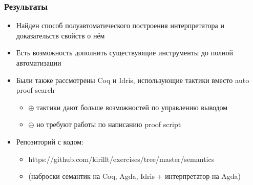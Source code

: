 \documentclass[10pt,pdf,hyperref={unicode}]{beamer}
\begin{document}
      \begin{frame}
          \frametitle{Результаты}
          \begin{itemize}
             \item Найден способ полуавтоматического построения интерпретатора и доказательств свойств о нём
             \item Есть возможность дополнить существующие инструменты до полной автоматизации
             \item Были также рассмотрены Coq и Idris, использующие тактики вместо auto proof search
                \begin{itemize}
                   \item[] $\oplus$  тактики дают больше возможностей по управлению выводом
                   \item[] $\ominus$ но требуют работы по написанию proof script
                \end{itemize}
             \item Репозиторий с кодом:
                \begin{itemize}
                   \item https://github.com/kirillt/exercises/tree/master/semantics
                   \item[] (наброски семантик на Coq, Agda, Idris + интерпретатор на Agda)
                \end{itemize}
          \end{itemize}
      \end{frame}

  
\end{document}
